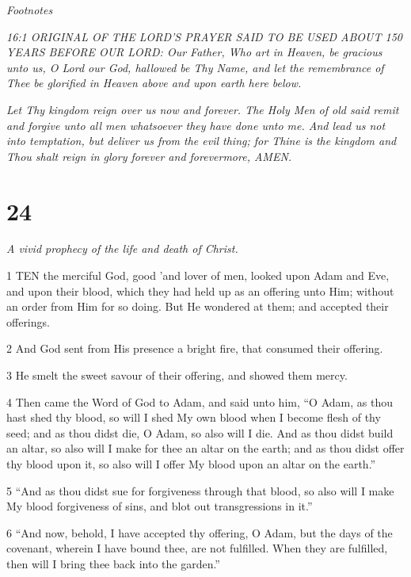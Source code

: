 \par \textit{Footnotes}

\par \textit{16:1 ORIGINAL OF THE LORD'S PRAYER SAID TO BE USED ABOUT 150 YEARS BEFORE OUR LORD: Our Father, Who art in Heaven, be gracious unto us, O Lord our God, hallowed be Thy Name, and let the remembrance of Thee be glorified in Heaven above and upon earth here below.}

\par \textit{Let Thy kingdom reign over us now and forever. The Holy Men of old said remit and forgive unto all men whatsoever they have done unto me. And lead us not into temptation, but deliver us from the evil thing; for Thine is the kingdom and Thou shalt reign in glory forever and forevermore, AMEN.}

\chapter{24}

\par \textit{A vivid prophecy of the life and death of Christ.}

\par 1 TEN the merciful God, good 'and lover of men, looked upon Adam and Eve, and upon their blood, which they had held up as an offering unto Him; without an order from Him for so doing. But He wondered at them; and accepted their offerings.

\par 2 And God sent from His presence a bright fire, that consumed their offering.

\par 3 He smelt the sweet savour of their offering, and showed them mercy.

\par 4 Then came the Word of God to Adam, and said unto him, “O Adam, as thou hast shed thy blood, so will I shed My own blood when I become flesh of thy seed; and as thou didst die, O Adam, so also will I die. And as thou didst build an altar, so also will I make for thee an altar on the earth; and as thou didst offer thy blood upon it, so also will I offer My blood upon an altar on the earth.”

\par 5 “And as thou didst sue for forgiveness through that blood, so also will I make My blood forgiveness of sins, and blot out transgressions in it.”

\par 6 “And now, behold, I have accepted thy offering, O Adam, but the days of the covenant, wherein I have bound thee, are not fulfilled. When they are fulfilled, then will I bring thee back into the garden.”

